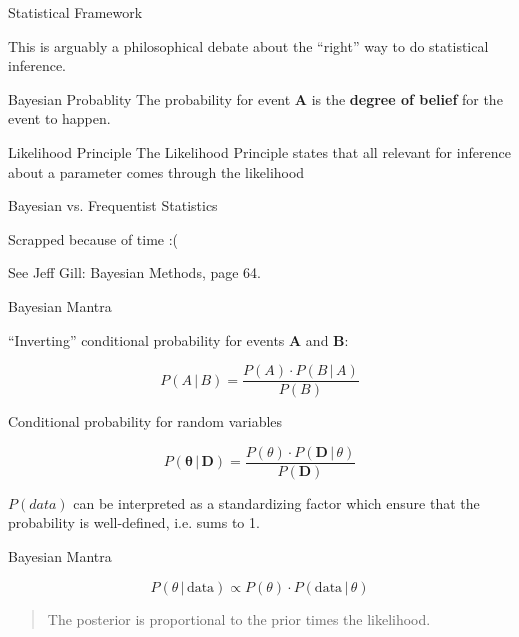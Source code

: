 \documentclass[10pt,handout]{beamer}
\begin{document}
\begin{frame}[t]{Statistical Framework}

  This is arguably a philosophical debate about the \enquote{right} way to do statistical inference.

  \begin{block}{Bayesian Probablity}
    The probability for event \textbf{A} is the \textbf{degree of belief} for the event to happen.
  \end{block}

  \begin{block}{Likelihood Principle}
    The Likelihood Principle \textcite{BW1988} states that all
relevant for inference about a parameter comes through the likelihood
  \end{block}

\end{frame}

\begin{frame}[c]{Bayesian vs. Frequentist Statistics}

  Scrapped because of time :(

  \vspace{3em}

  See Jeff Gill: Bayesian Methods, page 64.

\end{frame}





\begin{frame}[t]{Bayesian Mantra}

  \enquote{Inverting} conditional probability for events \textbf{A} and \textbf{B}:

  \[
    P(A\, |\, B) = \frac{P(A) \cdot P(B\, |\, A)}{P(B)}
  \]

  Conditional probability for random variables

  \[
    P(\mathbf{\theta}\, |\, \mathbf{D}) = \frac{P(\theta ) \cdot P(\mathbf{D}\, |\, \theta)}{P(\mathbf{D})}
  \]

  $P(data)$ can be interpreted as a standardizing factor which ensure that the probability is well-defined, i.e. sums to 1.

  \begin{block}{Bayesian Mantra}

  \[
    P(\theta\, |\, \text{data}) \propto P(\theta ) \cdot P(\text{data}\, |\, \theta)
  \]

  \begin{quote}
    The posterior is proportional to the prior times the likelihood.
  \end{quote}

  \end{block}

\end{frame}
\end{document}
